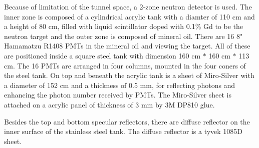 Because of limitation of the tunnel space, a 2-zone neutron detector is used.
The inner zone is composed of a cylindrical acrylic tank with a diamter of 110 cm and a height of 80 cm,
filled with liquid scintillator doped with 0.1\% Gd to be the neutron target and
the outer zone is composed of mineral oil. There are 16 8" Hamamatzu R1408 PMTs in the mineral oil and viewing the target.
All of these are positioned inside a square steel tank with dimension 160 cm $*$ 160 cm $*$ 113 cm. The 16 PMTs
are arranged in four columns, mounted in the four coners of the steel tank. On top and beneath the acrylic tank is
a sheet of Miro-Silver \cite{MiroSilver} with a diameter of 152 cm and a thickness of 0.5 mm, for reflecting photons and
enhancing the photon number received by PMTs.
The Miro-Silver sheet is attached on a acrylic panel of thickness of 3 mm by 3M DP810 \cite{3M} glue.

Besides the top and bottom specular reflectors, there are diffuse reflector on the inner surface of the stainless steel tank.
The diffuse reflector is a tyvek 1085D sheet.\cite{tyvek}

%




